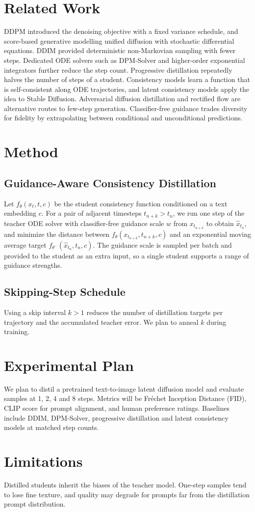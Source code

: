 \documentclass{article}
\begin{document}
\section{Related Work}
DDPM introduced the denoising objective with a fixed variance schedule, and
score-based generative modelling unified diffusion with stochastic
differential equations. DDIM provided deterministic non-Markovian sampling with
fewer steps. Dedicated ODE solvers such as DPM-Solver and higher-order
exponential integrators further reduce the step count. Progressive
distillation repeatedly halves the number of steps of a student. Consistency
models learn a function that is self-consistent along ODE trajectories, and
latent consistency models apply the idea to Stable Diffusion. Adversarial
diffusion distillation and rectified flow are alternative routes to few-step
generation. Classifier-free guidance trades diversity for fidelity by
extrapolating between conditional and unconditional predictions.

\section{Method}
\subsection{Guidance-Aware Consistency Distillation}
Let $f_\theta(x_t, t, c)$ be the student consistency function conditioned on a
text embedding $c$. For a pair of adjacent timesteps $t_{n+k} > t_n$, we run one
step of the teacher ODE solver with classifier-free guidance scale $w$ from
$x_{t_{n+k}}$ to obtain $\hat{x}_{t_n}$, and minimize the distance between
$f_\theta(x_{t_{n+k}}, t_{n+k}, c)$ and an exponential moving average target
$f_{\theta^-}(\hat{x}_{t_n}, t_n, c)$. The guidance scale is sampled per batch
and provided to the student as an extra input, so a single student supports a
range of guidance strengths.

\subsection{Skipping-Step Schedule}
Using a skip interval $k > 1$ reduces the number of distillation targets per
trajectory and the accumulated teacher error. We plan to anneal $k$ during
training.

\section{Experimental Plan}
We plan to distil a pretrained text-to-image latent diffusion model and
evaluate samples at 1, 2, 4 and 8 steps. Metrics will be Fréchet Inception
Distance (FID), CLIP score for prompt alignment, and human preference ratings.
Baselines include DDIM, DPM-Solver, progressive distillation and latent
consistency models at matched step counts.

\section{Limitations}
Distilled students inherit the biases of the teacher model. One-step samples
tend to lose fine texture, and quality may degrade for prompts far from the
distillation prompt distribution.
\end{document}
